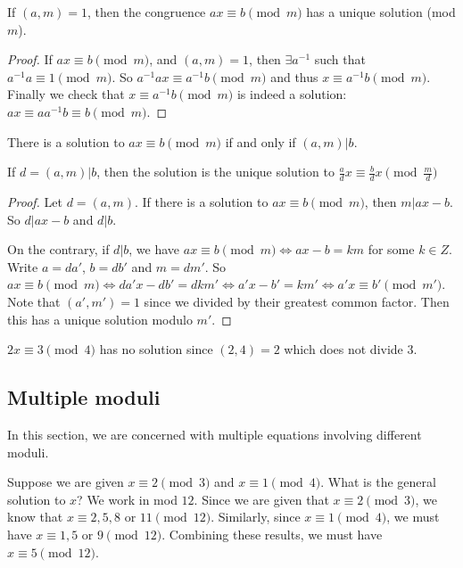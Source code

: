 \documentclass[a4paper]{article}
\begin{document}
\begin{cor}
  If $(a, m) = 1$, then the congruence $ax \equiv b\pmod m$ has a unique solution (mod $m$).
\end{cor}

\begin{proof}
  If $ax\equiv b\pmod m$, and $(a, m) = 1$, then $\exists a^{-1}$ such that $a^{-1}a\equiv 1\pmod m$. So $a^{-1}ax\equiv a^{-1}b\pmod m$ and thus $x\equiv a^{-1}b\pmod m$. Finally we check that $x \equiv a^{-1}b \pmod m$ is indeed a solution: $ax \equiv aa^{-1}b \equiv b \pmod m$.
\end{proof}

\begin{prop}
  There is a solution to $ax \equiv b\pmod m$ if and only if $(a, m) | b$.

  If $d = (a, m) | b$, then the solution is the unique solution to $\frac{a}{d}x \equiv \frac{b}{d} x\pmod {\frac{m}{d}}$
\end{prop}

\begin{proof}
  Let $d = (a, m)$. If there is a solution to $ax \equiv b\pmod m$, then $m | ax - b$. So $d | ax - b$ and $d | b$.

  On the contrary, if $d | b$, we have $ax \equiv b\pmod m \Leftrightarrow ax - b = km$ for some $k\in Z$. Write $a = da'$, $b = db'$ and $m = dm'$. So $ax\equiv b\pmod m \Leftrightarrow da'x - db' = dkm'\Leftrightarrow a'x - b' = km'\Leftrightarrow a'x \equiv b'\pmod {m'}$. Note that $(a', m') = 1$ since we divided by their greatest common factor. Then this has a unique solution modulo $m'$.
\end{proof}

\begin{eg}
  $2x \equiv 3 \pmod 4$ has no solution since $(2, 4) = 2$ which does not divide $3$.
\end{eg}

\subsection{Multiple moduli}
In this section, we are concerned with multiple equations involving different moduli.

Suppose we are given $x \equiv 2\pmod 3$ and $x\equiv 1\pmod 4$. What is the general solution to $x$? We work in mod $12$. Since we are given that $x\equiv 2\pmod 3$, we know that $x \equiv 2, 5, 8$ or $11 \pmod {12}$. Similarly, since $x \equiv 1 \pmod 4$, we must have $x \equiv 1, 5$ or $9\pmod {12}$. Combining these results, we must have $x \equiv 5\pmod {12}$.
\end{document}
